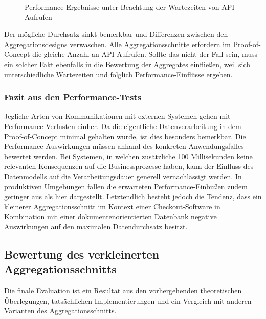 \begin{figure}[htpb]
	\centering
	\footnotesize
	
	\caption{Performance-Ergebnisse unter Beachtung der Wartezeiten von API-Aufrufen}
	\label{fig:PerformanceDelay}
\end{figure}

Der mögliche Durchsatz sinkt bemerkbar und Differenzen zwischen den Aggregationsdesigns verwaschen. Alle Aggregationsschnitte erfordern im Proof-of-Concept die gleiche Anzahl an API-Aufrufen. Sollte das nicht der Fall sein, muss ein solcher Fakt ebenfalls in die Bewertung der Aggregates einfließen, weil sich unterschiedliche Wartezeiten und folglich Performance-Einflüsse ergeben. 

\pagebreak

\subsubsection{Fazit aus den Performance-Tests}

Jegliche Arten von Kommunikationen mit externen Systemen gehen mit Performance-Verlusten einher. Da die eigentliche Datenverarbeitung in dem Proof-of-Concept minimal gehalten wurde, ist dies besonders bemerkbar. Die Performance-Auswirkungen müssen anhand des konkreten Anwendungsfalles bewertet werden. Bei Systemen, in welchen zusätzliche 100 Millisekunden keine relevanten Konsequenzen auf die Businessprozesse haben, kann der Einfluss des Datenmodells auf die Verarbeitungsdauer generell vernachlässigt werden. In produktiven Umgebungen fallen die erwarteten Performance-Einbußen zudem geringer aus als hier dargestellt. Letztendlich besteht jedoch die Tendenz, dass ein kleinerer Aggregationsschnitt im Kontext einer Checkout-Software in Kombination mit einer dokumentenorientierten Datenbank negative Auswirkungen auf den maximalen Datendurchsatz besitzt. \\

\subsection{Bewertung des verkleinerten Aggregationsschnitts}

Die finale Evaluation ist ein Resultat aus den vorhergehenden theoretischen Überlegungen, tatsächlichen Implementierungen und ein Vergleich mit anderen Varianten des Aggregationsschnitts.

